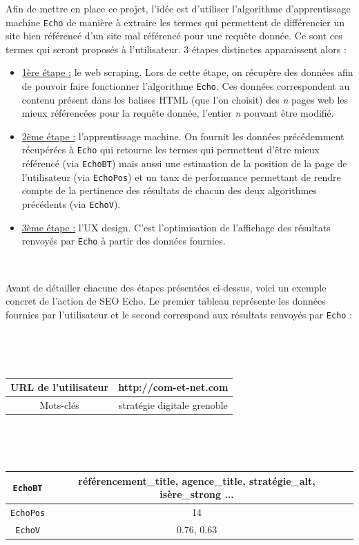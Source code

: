 \documentclass[12pt]{article}
\begin{document}
Afin de mettre en place ce projet, l'idée est d'utiliser l'algorithme d'apprentissage machine \texttt{Echo} de manière à extraire les termes qui permettent de différencier un site bien référencé d'un site mal référencé pour une requête donnée. Ce sont ces termes qui seront proposés à l'utilisateur. 3 étapes distinctes apparaissent alors :
\begin{itemize}
	\item \underline{1ère étape :} le web scraping. Lors de cette étape, on récupère des données afin de pouvoir faire fonctionner l'algorithme \texttt{Echo}. Ces données correspondent au contenu présent dans les balises HTML (que l'on choisit) des \textit{n} pages web les mieux référencées pour la requête donnée, l'entier \textit{n} pouvant être modifié.
	
	\item \underline{2ème étape :} l'apprentissage machine. On fournit les données précédemment récupérées à \texttt{Echo} qui retourne les termes qui permettent d'être mieux référencé (via \texttt{EchoBT}) mais aussi une estimation de la position de la page de l'utilisateur (via \texttt{EchoPos}) et un taux de performance permettant de rendre compte de la pertinence des résultats de chacun des deux algorithmes précédents (via \texttt{EchoV}).
	
	\item \underline{3ème étape :} l'UX design. C'est l'optimisation de l'affichage des résultats renvoyés par \texttt{Echo} à partir des données fournies.
\end{itemize}
	
\

Avant de détailler chacune des étapes présentées ci-dessus, voici un exemple concret de l'action de SEO Echo. Le premier tableau représente les données fournies par l'utilisateur et le second correspond aux résultats renvoyés par \texttt{Echo} :

\

\

\begin{center}
\begin{tabular}{|c|c|}
\hline
URL de l'utilisateur & http://com-et-net.com \\
\hline
Mots-clés & stratégie digitale grenoble \\
\hline
\end{tabular}

\

\

\begin{tabular}{|c|c|c|}
\hline
\texttt{EchoBT} & référencement\_title, agence\_title, stratégie\_alt, isère\_strong ... \\
\hline
\texttt{EchoPos} & 14 \\
\hline
\texttt{EchoV} & 0.76, 0.63 \\
\hline
\end{tabular}
\end{center}
\end{document}
